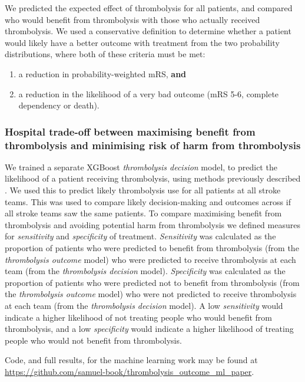 We predicted the expected effect of thrombolysis for all patients, and compared who would benefit from thrombolysis with those who actually received thrombolysis. We used a conservative definition to determine whether a patient would likely have a better outcome with treatment from the two probability distributions, where both of these criteria must be met: 

\begin{enumerate}
    \item a reduction in probability-weighted mRS, \textbf{and}
    \item a reduction in the likelihood of a very bad outcome (mRS 5-6, complete dependency or death).
\end{enumerate}

\subsubsection{Hospital trade-off between maximising benefit from thrombolysis and minimising risk of harm from thrombolysis}

We trained a separate XGBoost \textit{thrombolysis decision} model, to predict the likelihood of a patient receiving thrombolysis, using methods previously described \cite{pearn_what_2023}. We used this to predict likely thrombolysis use for all patients at all stroke teams. This was used to compare likely decision-making and outcomes across if all stroke teams saw the same patients. To compare maximising benefit from thrombolysis and avoiding potential harm from thrombolysis we defined measures for \textit{sensitivity} and \textit{specificity} of treatment. \textit{Sensitivity} was calculated as the proportion of patients who were predicted to benefit from thrombolysis (from the \textit{thrombolysis outcome} model) who were predicted to receive thrombolysis at each team (from the \textit{thrombolysis decision} model). \textit{Specificity} was calculated as the proportion of patients who were predicted not to benefit from thrombolysis (from the \textit{thrombolysis outcome} model) who were not predicted to receive thrombolysis at each team (from the \textit{thrombolysis decision} model). A low \textit{sensitivity} would indicate a higher likelihood of not treating people who would benefit from thrombolysis, and a low \textit{specificity} would indicate a higher likelihood of treating people who would not benefit from thrombolysis.

Code, and full results, for the machine learning work may be found at \url{https://github.com/samuel-book/thrombolysis_outcome_ml_paper}.


